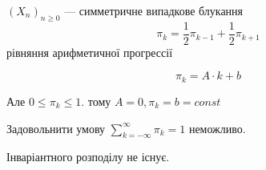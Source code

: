 \begin{example}
  $\left( X_n \right)_{n\geq 0}$ --- симметричне випадкове блукання
\[ \pi_k = \frac{1}{2} \pi_{k-1} + \frac{1}{2} \pi_{k + 1} \] 
рівняння арифметичної прогрессії

\[ \pi_k = A \cdot k + b \] 

Але $0 \leq \pi_k \leq 1$. тому $A=0, \pi_k = b = const$

Задовольнити умову $\sum_{k=-\infty}^{\infty} \pi_k = 1$ неможливо.

Інваріантного розподілу не існує.
\end{example}








